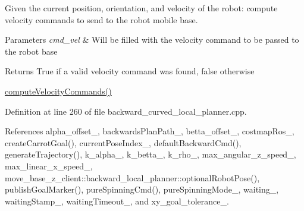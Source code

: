 Given the current position, orientation, and velocity of the robot\+: compute velocity commands to send to the robot mobile base. 


\begin{DoxyParams}{Parameters}
{\em cmd\+\_\+vel} & Will be filled with the velocity command to be passed to the robot base \\
\hline
\end{DoxyParams}
\begin{DoxyReturn}{Returns}
True if a valid velocity command was found, false otherwise
\end{DoxyReturn}
\hyperlink{classmove__base__z__client_1_1backward__local__planner_1_1BackwardLocalPlanner_a8e7dec0bc31856d814d8fa6df747bbb8}{compute\+Velocity\+Commands()} 

Definition at line 260 of file backward\+\_\+curved\+\_\+local\+\_\+planner.\+cpp.



References alpha\+\_\+offset\+\_\+, backwards\+Plan\+Path\+\_\+, betta\+\_\+offset\+\_\+, costmap\+Ros\+\_\+, create\+Carrot\+Goal(), current\+Pose\+Index\+\_\+, default\+Backward\+Cmd(), generate\+Trajectory(), k\+\_\+alpha\+\_\+, k\+\_\+betta\+\_\+, k\+\_\+rho\+\_\+, max\+\_\+angular\+\_\+z\+\_\+speed\+\_\+, max\+\_\+linear\+\_\+x\+\_\+speed\+\_\+, move\+\_\+base\+\_\+z\+\_\+client\+::backward\+\_\+local\+\_\+planner\+::optional\+Robot\+Pose(), publish\+Goal\+Marker(), pure\+Spinning\+Cmd(), pure\+Spinning\+Mode\+\_\+, waiting\+\_\+, waiting\+Stamp\+\_\+, waiting\+Timeout\+\_\+, and xy\+\_\+goal\+\_\+tolerance\+\_\+.


